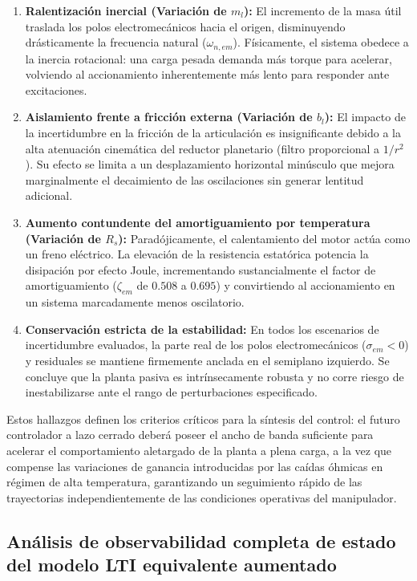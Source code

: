 \documentclass[10pt,a4paper]{article}
\begin{document}
\begin{enumerate}
    \item \textbf{Ralentización inercial (Variación de $m_l$):} El incremento de la masa útil traslada los polos electromecánicos hacia el origen, disminuyendo drásticamente la frecuencia natural ($\omega_{n,em}$). Físicamente, el sistema obedece a la inercia rotacional: una carga pesada demanda más torque para acelerar, volviendo al accionamiento inherentemente más lento para responder ante excitaciones.
    
    \item \textbf{Aislamiento frente a fricción externa (Variación de $b_l$):} El impacto de la incertidumbre en la fricción de la articulación es insignificante debido a la alta atenuación cinemática del reductor planetario (filtro proporcional a $1/r^2$). Su efecto se limita a un desplazamiento horizontal minúsculo que mejora marginalmente el decaimiento de las oscilaciones sin generar lentitud adicional.
    
    \item \textbf{Aumento contundente del amortiguamiento por temperatura (Variación de $R_s$):} Paradójicamente, el calentamiento del motor actúa como un freno eléctrico. La elevación de la resistencia estatórica potencia la disipación por efecto Joule, incrementando sustancialmente el factor de amortiguamiento ($\zeta_{em}$ de $0.508$ a $0.695$) y convirtiendo al accionamiento en un sistema marcadamente menos oscilatorio.
    
    \item \textbf{Conservación estricta de la estabilidad:} En todos los escenarios de incertidumbre evaluados, la parte real de los polos electromecánicos ($\sigma_{em} < 0$) y residuales se mantiene firmemente anclada en el semiplano izquierdo. Se concluye que la planta pasiva es intrínsecamente robusta y no corre riesgo de inestabilizarse ante el rango de perturbaciones especificado.
\end{enumerate}

Estos hallazgos definen los criterios críticos para la síntesis del control: el futuro controlador a lazo cerrado deberá poseer el ancho de banda suficiente para acelerar el comportamiento aletargado de la planta a plena carga, a la vez que compense las variaciones de ganancia introducidas por las caídas óhmicas en régimen de alta temperatura, garantizando un seguimiento rápido de las trayectorias independientemente de las condiciones operativas del manipulador.

\subsection{Análisis de observabilidad completa de estado del modelo LTI equivalente aumentado}
\end{document}
